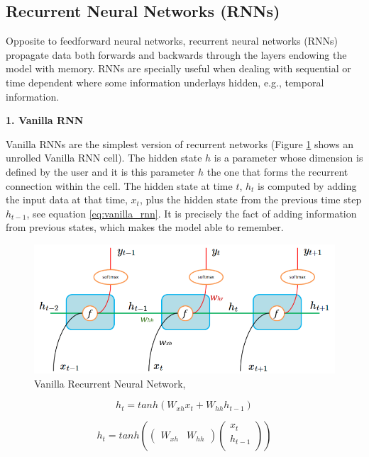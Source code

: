 \subsection{Recurrent Neural Networks (RNNs)}

Opposite to feedforward neural networks, recurrent neural networks (RNNs) propagate data both forwards and backwards through the layers endowing the model with memory. RNNs are specially useful when dealing with sequential or time dependent where some information underlays hidden, e.g., temporal information.

\vspace{5mm} 
\textbf{1. Vanilla RNN}

Vanilla RNNs are the simplest version of recurrent networks (Figure \ref{fig:rnn} shows an unrolled Vanilla RNN cell). The hidden state $h$ is a parameter whose dimension is defined by the user and it is this parameter $h$ the one that forms the recurrent connection within the cell. The hidden state at time $t$, $h_t$ is computed by adding the input data at that time, $x_t$, plus the hidden state from the previous time step $h_{t-1}$, see equation \ref{eq:vanilla_rnn}. It is precisely the fact of adding information from previous states, which makes the model able to remember.

%

\begin{figure}[H]
    \centering
    \includegraphics[width=.7\textwidth]{Figures/rnn.png}
    \caption{Vanilla Recurrent Neural Network, \cite{Vanilla-RNN-image}}
    \label{fig:rnn}
\end{figure}



\begin{equation}
h_t=tanh(W_{xh}x_t+W_{hh}h_{t−1})
\end{equation}


\begin{equation}
h_t = tanh\left(\begin{pmatrix}
W_{xh} & W_{hh}
\end{pmatrix}
\begin{pmatrix}
x_t \\
h_{t−1} \\
\end{pmatrix}\right)
\label{eq:vanilla_rnn}
\end{equation}


